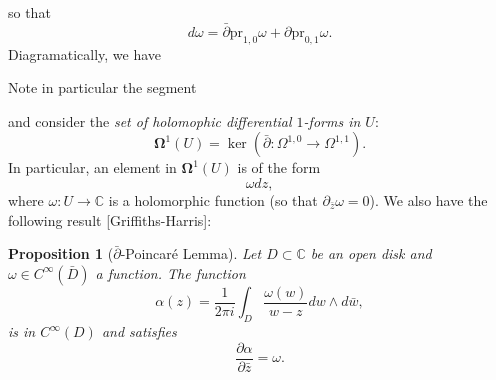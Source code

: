 \documentclass[12pt,a4paper]{book}
\newtheorem{prop}[thm]{Proposition}
\theoremstyle{definition} \newtheorem{defn}[thm]{Definition}
\theoremstyle{definition} \newtheorem{ejemplo}[thm]{Example}
\theoremstyle{definition} \newtheorem{ejercicio}[thm]{Exercise}
\theoremstyle{remark} \newtheorem*{obs}{Remark}
\def\pr{\mathrm{pr}}
\def\CC{\mathbb{C}}
\begin{document}
    so that
    \begin{equation*}
      d\omega = \bar{\partial} \pr_{1,0}\omega + \partial \pr_{0,1} \omega.
    \end{equation*}
    Diagramatically, we have 
    \begin{center}
    \end{center}
Note in particular the segment
\begin{center}
\end{center}
and consider the \emph{set of holomophic differential $1$-forms in $U$}:
\begin{equation*}
  \boldsymbol{\Omega}^1(U) = \ker(\bar{\partial}: \Omega^{1,0} \rightarrow \Omega^{1,1}).
\end{equation*}
In particular, an element in $\boldsymbol{\Omega}^1(U)$ is of the form
\begin{equation*}
  \omega dz,
\end{equation*}
where $\omega:U\rightarrow \CC$ is a holomorphic function (so that $\partial_{\bar{z}}\omega=0$).
We also have the following result [Griffiths-Harris]:
\begin{prop}[$\bar{\partial}$-Poincaré Lemma]
  Let $D\subset \CC$ be an open disk and $\omega \in C^\infty(\bar{D})$ a function. The function
  \begin{equation*}
    \alpha(z) = \frac{1}{2\pi i}\int_D \frac{\omega(w)}{w-z} dw \wedge d\bar{w},
  \end{equation*}
  is in $C^\infty(D)$ and satisfies
  \begin{equation*}
    \frac{\partial \alpha}{\partial \bar{z}}=\omega.
  \end{equation*}
\end{prop}
\end{document}
